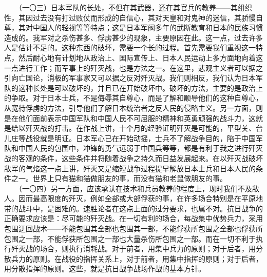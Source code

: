 \documentclass[cn,11pt,chinese]{elegantbook}
\begin{document}
　　（一〇三）日本军队的长处，不但在其武器，还在其官兵的教养——其组织性，其因过去没有打过败仗而形成的自信心，其对天皇和对鬼神的迷信，其骄慢自尊，其对中国人的轻视等等特点；这是日本军阀多年的武断教育和日本的民族习惯造成的。我军对之杀伤甚多、俘虏甚少的现象，主要原因在此。这一点，过去许多人是估计不足的。这种东西的破坏，需要一个长的过程。首先需要我们重视这一特点，然后耐心地有计划地从政治上、国际宣传上、日本人民运动上多方面地向着这一点进行工作；而军事上的歼灭战，也是方法之一。在这里，悲观主义者可以据之引向亡国论，消极的军事家又可以据之反对歼灭战。我们则相反，我们认为日本军队的这种长处是可以破坏的，并且已在开始破坏中。破坏的方法，主要的是政治上的争取。对于日本士兵，不是侮辱其自尊心，而是了解和顺导他们的这种自尊心，从宽待俘虏的方法，引导他们了解日本统治者之反人民的侵略主义。另一方面，则是在他们面前表示中国军队和中国人民不可屈服的精神和英勇顽强的战斗力，这就是给以歼灭战的打击。在作战上讲，十个月的经验证明歼灭是可能的，平型关、台儿庄等战役就是明证。日本军心已在开始动摇，士兵不了解战争目的，陷于中国军队和中国人民的包围中，冲锋的勇气远弱于中国兵等等，都是有利于我之进行歼灭战的客观的条件，这些条件并将随着战争之持久而日益发展起来。在以歼灭战破坏敌军的气焰这一点上讲，歼灭又是缩短战争过程提早解放日本士兵和日本人民的条件之一。世界上只有猫和猫做朋友的事，而没有猫和老鼠做朋友的事。\\
　　（一〇四）另一方面，应该承认在技术和兵员教养的程度上，现时我们不及敌人。因而最高限度的歼灭，例如全部或大部俘获的事，在许多场合特别是在平原地带的战斗中，是困难的。速胜论者在这点上面的过分要求，也属不对。抗日战争的正确要求应该是：尽可能的歼灭战。在一切有利的场合，每战集中优势兵力，采用包围迂回战术——不能包围其全部也包围其一部，不能俘获所包围之全部也俘获所包围之一部，不能俘获所包围之一部也大量杀伤所包围之一部。而在一切不利于执行歼灭战的场合，则执行消耗战。对于前者，用集中兵力的原则；对于后者，用分散兵力的原则。在战役的指挥关系上，对于前者，用集中指挥的原则；对于后者，用分散指挥的原则。这些，就是抗日战争战场作战的基本方针。\\
\end{document}
